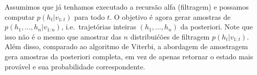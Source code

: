 \begin{center}
\end{center}
Assumimos que j\'a tenhamos executado a recurs\~ao alfa (filtragem) e
possamos computar $p(h_t | v_{1:t})$ para todo $t$. O objetivo \'e agora
gerar amostras de $p(h_1, \ldots, h_n | v_{1:n})$, i.e.\ trajet\'orias
inteiras $(h_1, \ldots, h_n)$ da posteriori. Note que isso n\~ao \'e o mesmo que amostrar das $n$ distribui\'c\~oes de filtragem $p(h_t |
v_{1:t})$. Al\'em disso, comparado ao algoritmo de Viterbi, a abordagem de amostragem
gera amostras da posteriori completa, em vez de apenas retornar
o estado mais prov\'avel e sua probabilidade correspondente.

